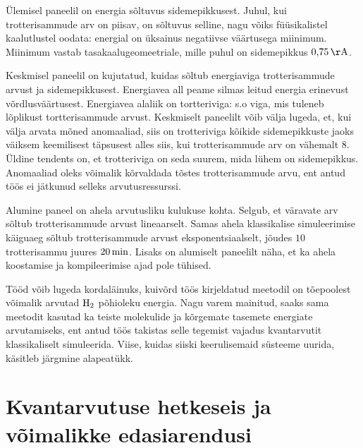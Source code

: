\documentclass[12pt]{report}
\begin{document}
Ülemisel paneelil on energia sõltuvus sidemepikkusest.
Juhul, kui trotterisammude arv on piisav, on sõltuvus selline, nagu võiks füüsikalistel kaalutlustel oodata: energial on üksainus negatiivse väärtusega miinimum.
Miinimum vastab tasakaalugeomeetriale, mille puhul on sidemepikkus \(0{,}75\,{\rm Å}\).

Keskmisel paneelil on kujutatud, kuidas sõltub energiaviga trotterisammude arvust ja sidemepikkusest.
Energiavea all peame silmas leitud energia erinevust võrdlusväärtusest.
Energiavea alaliik on tortteriviga: s.o viga, mis tuleneb lõplikust tortterisammude arvust.
Keskmiselt paneelilt võib välja lugeda, et, kui välja arvata mõned anomaaliad, siis on trotteriviga kõikide sidemepikkuste jaoks väiksem keemilisest täpsusest alles siis, kui trotterisammude arv on vähemalt \(8\).
Üldine tendents on, et trotteriviga on seda suurem, mida lühem on sidemepikkus.
Anomaaliad oleks võimalik kõrvaldada tõstes trotterisammude arvu, ent antud töös ei jätkunud selleks arvutusressurssi.

Alumine paneel on ahela arvutusliku kulukuse kohta.
Selgub, et väravate arv sõltub trotterisammude arvust lineaarselt.
Samas ahela klassikalise simuleerimise käiguaeg sõltub trotterisammude arvust eksponentsiaalselt, jõudes \(10\) trotterisammu juures \(20\,{\rm min}\).
Lisaks on alumiselt paneelilt näha, et ka ahela koostamise ja kompileerimise ajad pole tühised.

Tööd võib lugeda kordaläinuks, kuivõrd töös kirjeldatud meetodil on tõepoolest võimalik arvutad \(\rm H_2\) põhioleku energia.
Nagu varem mainitud, saaks sama meetodit kasutad ka teiste molekulide ja kõrgemate tasemete energiate arvutamiseks, ent antud töös takistas selle tegemist vajadus kvantarvutit klassikaliselt simuleerida.
Viise, kuidas siiski keerulisemaid süsteeme uurida, käsitleb järgmine alapeatükk.

\section{Kvantarvutuse hetkeseis ja võimalikke edasiarendusi}
\end{document}
